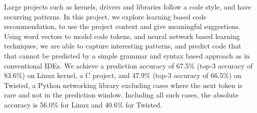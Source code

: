 Large projects such as kernels, drivers and libraries follow a code
style, and have recurring patterns. In this project, we explore learning based
code recommendation, to use the project context and give meaningful
suggestions.
Using word vectors to model code tokens, and neural network based learning
techniques, we are able to capture interesting patterns, and predict code that
that cannot be predicted by a simple grammar and syntax based approach as in
conventional IDEs.
We achieve a prediction accuracy of 67.5\% (top-3 accuracy of 83.6\%) on Linux
kernel, a C project, and 47.9\% (top-3 accuracy of 66.5\%) on Twisted, a Python
networking library excluding cases where the next token is rare and not in the
prediction window. Including all such cases, the absolute accuracy is 56.0\% for
Linux and 40.6\% for Twisted.
